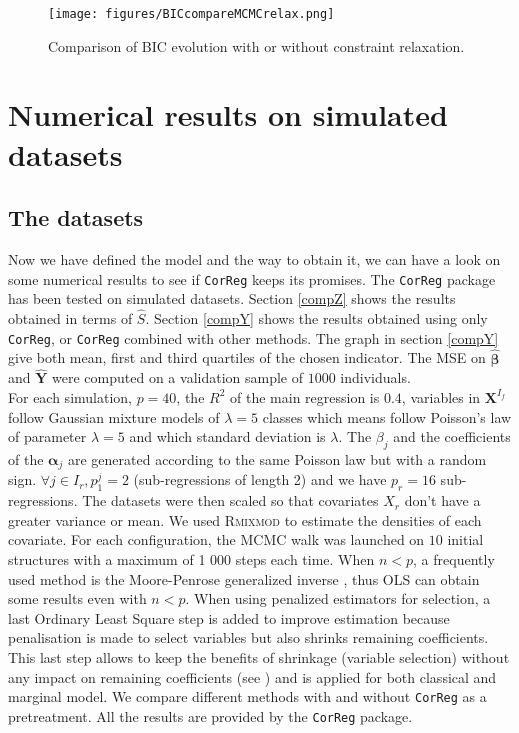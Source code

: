 \documentclass[12pt,a4paper]{report}
\begin{document}
\begin{center}
	\begin{figure}[h!]
	\centering
\texttt{[image: figures/BICcompareMCMCrelax.png]} 		
\caption{Comparison of BIC evolution with or without constraint relaxation.}\label{compareBICrelax}
	\end{figure}
	\end{center}
			
		
	\chapter{Numerical results on simulated datasets} \label{sectionsimul}


	\section{The datasets}	
	Now we have defined the model and the way to obtain it, we can have a look on some numerical results to see if {\tt CorReg} 	keeps its promises.
	The {\tt CorReg} package has been tested on simulated datasets. 
Section \ref{compZ} shows the results obtained in terms of $\hat{S}$. Section \ref{compY} shows the results obtained using only {\tt CorReg}, or {\tt CorReg} combined with other methods. The graph in section \ref{compY} give both mean, first and third quartiles of the chosen indicator. The MSE on $\hat{\boldsymbol{\beta}}$ and $\hat{\boldsymbol{Y}}$ were computed on a validation sample of $1 000$ individuals. \\

For each simulation,  $p=40$, the $R^2$ of the main regression is $0.4$, variables in $\boldsymbol{X}^{I_f}$ follow Gaussian mixture models of $\lambda=5$ classes which means follow Poisson's law of parameter $\lambda=5$ and which standard deviation is $\lambda$. The $\beta_j$ and the coefficients of the $\boldsymbol{\alpha}_j$ are generated according to the same Poisson law but with a random sign. $\forall j \in I_r, p_1^j=2$ (sub-regressions of length 2) and we have $p_r=16$ sub-regressions. The datasets were then scaled so that covariates $X_r$ don't have a greater variance or mean.
	We used \textsc{Rmixmod} to estimate the densities of each covariate. For each configuration, the MCMC walk was launched on $10$ initial structures with a maximum of 1 000 steps each time.
	When $n<p$, a frequently used method is the Moore-Penrose generalized inverse \cite{katsikis2008fast}, thus OLS can obtain some results even with $n<p$. %
	When using penalized estimators for selection, a last Ordinary Least Square step is added to improve estimation because penalisation is made to select variables but also shrinks remaining coefficients. This last step allows to keep the benefits of shrinkage (variable selection) without any impact on remaining coefficients (see \cite{SAM10088}) and is applied for both classical and marginal model.
	We compare different methods with and without {\tt CorReg} as a pretreatment. All the results are provided by the {\tt CorReg} package.
	
\end{document}
